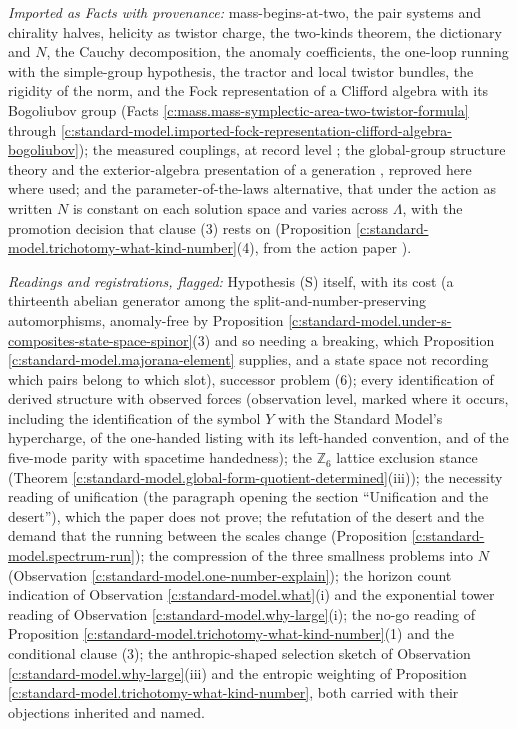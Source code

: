 \documentclass[11pt]{article}
\theoremstyle{definition}
\theoremstyle{plain}
\begin{document}
\emph{Imported as Facts with provenance:} mass-begins-at-two, the pair systems and chirality halves, helicity as twistor charge, the two-kinds theorem, the dictionary and $N$, the Cauchy decomposition, the anomaly coefficients, the one-loop running with the simple-group hypothesis, the tractor and local twistor bundles, the rigidity of the norm, and the Fock representation of a Clifford algebra with its Bogoliubov group (Facts \ref{c:mass.mass-symplectic-area-two-twistor-formula} through \ref{c:standard-model.imported-fock-representation-clifford-algebra-bogoliubov}); the measured couplings, at record level \cite{PDG2024}; the global-group structure theory and the exterior-algebra presentation of a generation \cite{BaezHuerta2010, Tong2017}, reproved here where used; and the parameter-of-the-laws alternative, that under the action as written $N$ is constant on each solution space and varies across $\Lambda$, with the promotion decision that clause (3) rests on (Proposition \ref{c:standard-model.trichotomy-what-kind-number}(4), from the action paper \cite[Prop.~5.8, Rem.~5.9]{ButlerT10}).

\emph{Readings and registrations, flagged:} Hypothesis (S) itself, with its cost (a thirteenth abelian generator among the split-and-number-preserving automorphisms, anomaly-free by Proposition \ref{c:standard-model.under-s-composites-state-space-spinor}(3) and so needing a breaking, which Proposition \ref{c:standard-model.majorana-element} supplies, and a state space not recording which pairs belong to which slot), successor problem (6); every identification of derived structure with observed forces (observation level, marked where it occurs, including the identification of the symbol $Y$ with the Standard Model's hypercharge, of the one-handed listing with its left-handed convention, and of the five-mode parity with spacetime handedness); the $\mathbb{Z}_{6}$ lattice exclusion stance (Theorem \ref{c:standard-model.global-form-quotient-determined}(iii)); the necessity reading of unification (the paragraph opening the section ``Unification and the desert''), which the paper does not prove; the refutation of the desert and the demand that the running between the scales change (Proposition \ref{c:standard-model.spectrum-run}); the compression of the three smallness problems into $N$ (Observation \ref{c:standard-model.one-number-explain}); the horizon count indication of Observation \ref{c:standard-model.what}(i) and the exponential tower reading of Observation \ref{c:standard-model.why-large}(i); the no-go reading of Proposition \ref{c:standard-model.trichotomy-what-kind-number}(1) and the conditional clause (3); the anthropic-shaped selection sketch of Observation \ref{c:standard-model.why-large}(iii) and the entropic weighting of Proposition \ref{c:standard-model.trichotomy-what-kind-number}, both carried with their objections inherited and named.
\end{document}
